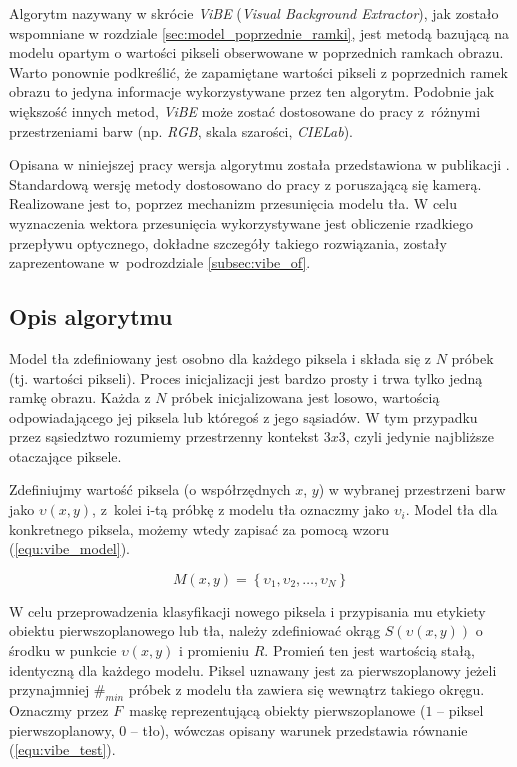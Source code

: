 Algorytm nazywany w skrócie \textit{ViBE} (\textit{Visual Background Extractor}), jak zostało wspomniane w rozdziale \ref{sec:model_poprzednie_ramki}, jest metodą bazującą na modelu opartym o wartości pikseli obserwowane w poprzednich ramkach obrazu. 
Warto ponownie podkreślić, że zapamiętane wartości pikseli z poprzednich ramek obrazu to jedyna informacje wykorzystywane przez ten algorytm. Podobnie jak większość innych metod, \textit{ViBE} może zostać dostosowane do pracy z~różnymi przestrzeniami barw (np. \textit{RGB}, skala szarości, \textit{CIELab}).

Opisana w niniejszej pracy wersja algorytmu została przedstawiona w publikacji \cite{kryjak_14_vibe}. 
Standardową wersję metody dostosowano do pracy z poruszającą się kamerą. 
Realizowane jest to, poprzez mechanizm przesunięcia modelu tła. 
W celu wyznaczenia wektora przesunięcia wykorzystywane jest obliczenie rzadkiego przepływu optycznego, dokładne szczegóły takiego rozwiązania, zostały zaprezentowane w~podrozdziale \ref{subsec:vibe_of}.

\subsection{Opis algorytmu}
\label{subsec:vibe_opis}

Model tła zdefiniowany jest osobno dla każdego piksela i składa się z $N$ próbek (tj. wartości pikseli). 
Proces inicjalizacji jest bardzo prosty i trwa tylko jedną ramkę obrazu. 
Każda z $N$ próbek inicjalizowana jest losowo, wartością odpowiadającego jej piksela lub któregoś z jego sąsiadów. 
W tym przypadku przez sąsiedztwo rozumiemy przestrzenny kontekst $3x3$, czyli jedynie najbliższe otaczające piksele. 

Zdefiniujmy wartość piksela (o współrzędnych $x$, $y$) w wybranej przestrzeni barw jako $\upsilon(x,y)$, z~kolei i-tą próbkę z modelu tła oznaczmy jako $\upsilon_i$. 
Model tła dla konkretnego piksela, możemy wtedy zapisać za pomocą wzoru (\ref{equ:vibe_model}).

	\begin{equation}
		M(x,y)= \left\{ \upsilon_1, \upsilon_2, \dotsc, \upsilon_N \right\}
	\label{equ:vibe_model}	
	\end{equation}
	
W celu przeprowadzenia klasyfikacji nowego piksela i przypisania mu etykiety obiektu pierwszoplanowego lub tła, należy zdefiniować okrąg $S(\upsilon(x,y))$ o środku w punkcie $\upsilon(x,y)$ i promieniu $R$. 
Promień ten jest wartością stałą, identyczną dla każdego modelu. 
Piksel uznawany jest za pierwszoplanowy jeżeli przynajmniej $\#_{min}$ próbek z modelu tła zawiera się wewnątrz takiego okręgu. 
Oznaczmy przez $F$~maskę reprezentującą obiekty pierwszoplanowe ($1$ -- piksel pierwszoplanowy, $0$ -- tło), wówczas opisany warunek przedstawia równanie (\ref{equ:vibe_test}).

